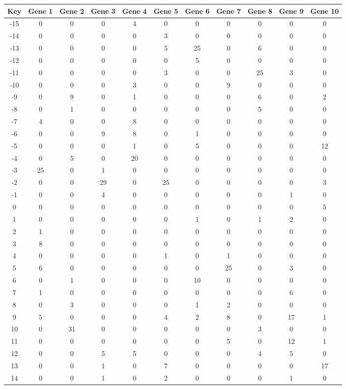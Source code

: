 \begin{tabular}{|c|c|c|c|c|c|c|c|c|c|c|}
\hline
Key & Gene 1 & Gene 2 & Gene 3 & Gene 4 & Gene 5 & Gene 6 & Gene 7 & Gene 8 & Gene 9 & Gene 10 \\
\hline
-15 & 0 & 0 & 0 & 4 & 0 & 0 & 0 & 0 & 0 & 0 \\
-14 & 0 & 0 & 0 & 0 & 3 & 0 & 0 & 0 & 0 & 0 \\
-13 & 0 & 0 & 0 & 0 & 5 & 25 & 0 & 6 & 0 & 0 \\
-12 & 0 & 0 & 0 & 0 & 0 & 5 & 0 & 0 & 0 & 0 \\
-11 & 0 & 0 & 0 & 0 & 3 & 0 & 0 & 25 & 3 & 0 \\
-10 & 0 & 0 & 0 & 3 & 0 & 0 & 9 & 0 & 0 & 0 \\
-9 & 0 & 9 & 0 & 1 & 0 & 0 & 0 & 6 & 0 & 2 \\
-8 & 0 & 1 & 0 & 0 & 0 & 0 & 0 & 5 & 0 & 0 \\
-7 & 4 & 0 & 0 & 8 & 0 & 0 & 0 & 0 & 0 & 0 \\
-6 & 0 & 0 & 9 & 8 & 0 & 1 & 0 & 0 & 0 & 9 \\
-5 & 0 & 0 & 0 & 1 & 0 & 5 & 0 & 0 & 0 & 12 \\
-4 & 0 & 5 & 0 & 20 & 0 & 0 & 0 & 0 & 0 & 0 \\
-3 & 25 & 0 & 1 & 0 & 0 & 0 & 0 & 0 & 0 & 0 \\
-2 & 0 & 0 & 29 & 0 & 25 & 0 & 0 & 0 & 0 & 3 \\
-1 & 0 & 0 & 4 & 0 & 0 & 0 & 0 & 0 & 1 & 0 \\
0 & 0 & 0 & 0 & 0 & 0 & 0 & 0 & 0 & 0 & 5 \\
1 & 0 & 0 & 0 & 0 & 0 & 1 & 0 & 1 & 2 & 0 \\
2 & 1 & 0 & 0 & 0 & 0 & 0 & 0 & 0 & 0 & 0 \\
3 & 8 & 0 & 0 & 0 & 0 & 0 & 0 & 0 & 0 & 0 \\
4 & 0 & 0 & 0 & 0 & 1 & 0 & 1 & 0 & 0 & 0 \\
5 & 6 & 0 & 0 & 0 & 0 & 0 & 25 & 0 & 3 & 0 \\
6 & 0 & 1 & 0 & 0 & 0 & 10 & 0 & 0 & 0 & 0 \\
7 & 1 & 0 & 0 & 0 & 0 & 0 & 0 & 0 & 6 & 0 \\
8 & 0 & 3 & 0 & 0 & 0 & 1 & 2 & 0 & 0 & 0 \\
9 & 5 & 0 & 0 & 0 & 4 & 2 & 8 & 0 & 17 & 1 \\
10 & 0 & 31 & 0 & 0 & 0 & 0 & 0 & 3 & 0 & 0 \\
11 & 0 & 0 & 0 & 0 & 0 & 0 & 5 & 0 & 12 & 1 \\
12 & 0 & 0 & 5 & 5 & 0 & 0 & 0 & 4 & 5 & 0 \\
13 & 0 & 0 & 1 & 0 & 7 & 0 & 0 & 0 & 0 & 17 \\
14 & 0 & 0 & 1 & 0 & 2 & 0 & 0 & 0 & 1 & 0 \\
\hline
\end{tabular}